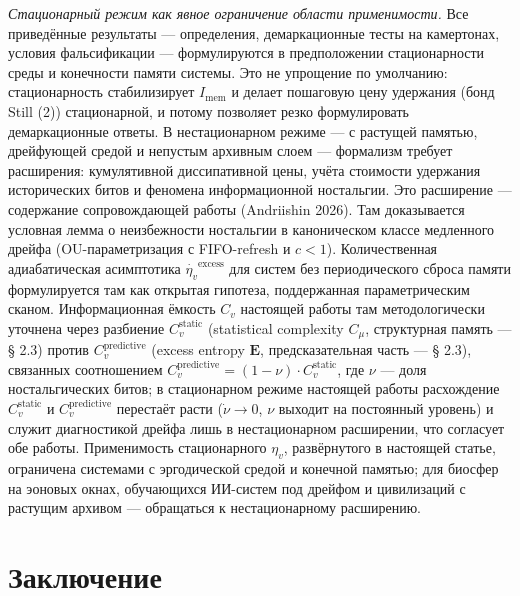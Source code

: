\documentclass[pdflatex,sn-mathphys-ay]{sn-jnl}
\begin{document}
\emph{Стационарный режим как явное ограничение области применимости.} Все приведённые результаты --- определения, демаркационные тесты на камертонах, условия фальсификации --- формулируются в предположении стационарности среды и конечности памяти системы. Это не упрощение по умолчанию: стационарность стабилизирует \(I_{\text{mem}}\) и делает пошаговую цену удержания (бонд Still (2)) стационарной, и потому позволяет резко формулировать демаркационные ответы. В нестационарном режиме --- с растущей памятью, дрейфующей средой и непустым архивным слоем --- формализм требует расширения: кумулятивной диссипативной цены, учёта стоимости удержания исторических битов и феномена информационной ностальгии. Это расширение --- содержание сопровождающей работы (Andriishin 2026). Там доказывается условная лемма о неизбежности ностальгии в каноническом классе медленного дрейфа (OU-параметризация с FIFO-refresh и \(c < 1\)). Количественная адиабатическая асимптотика \(\dot{\eta_v}^{\text{excess}}\) для систем без периодического сброса памяти формулируется там как открытая гипотеза, поддержанная параметрическим сканом. Информационная ёмкость \(C_v\) настоящей работы там методологически уточнена через разбиение \(C_v^{\text{static}}\) (statistical complexity \(C_\mu\), структурная память --- § 2.3) против \(C_v^{\text{predictive}}\) (excess entropy \(\mathbf{E}\), предсказательная часть --- § 2.3), связанных соотношением \(C_v^{\text{predictive}} = (1 - \nu) \cdot C_v^{\text{static}}\), где \(\nu\) --- доля ностальгических битов; в стационарном режиме настоящей работы расхождение \(C_v^{\text{static}}\) и \(C_v^{\text{predictive}}\) перестаёт расти (\(\dot\nu \to 0\), \(\nu\) выходит на постоянный уровень) и служит диагностикой дрейфа лишь в нестационарном расширении, что согласует обе работы. Применимость стационарного \(\eta_v\), развёрнутого в настоящей статье, ограничена системами с эргодической средой и конечной памятью; для биосфер на эоновых окнах, обучающихся ИИ-систем под дрейфом и цивилизаций с растущим архивом --- обращаться к нестационарному расширению.

\section{Заключение}\label{ux437ux430ux43aux43bux44eux447ux435ux43dux438ux435}
\end{document}
